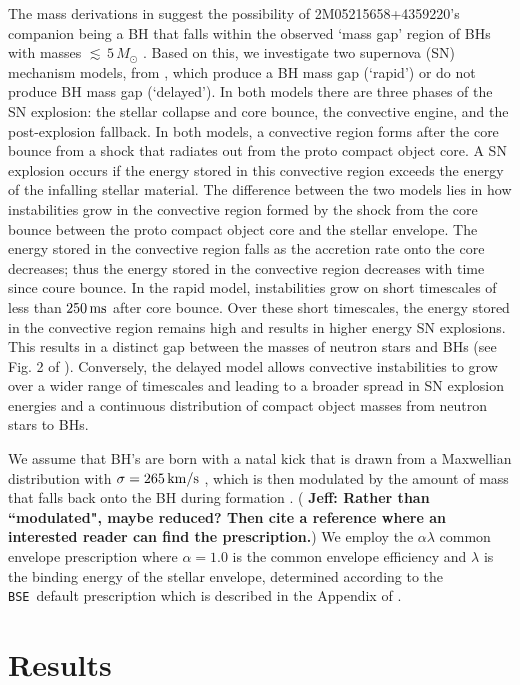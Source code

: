 \documentclass[twocolumn,tighten]{aastex61}
\newcommand{\ms}{\rm{ms}}
\newcommand{\bse}{\texttt{BSE}}
\newcommand{\jeff}[1]{\textbf{\color{teal} Jeff: #1}}
\begin{document}
The mass derivations in \citet{Thompson2018} suggest the possibility of 2M05215658+4359220's companion being a BH that falls within the observed `mass gap' region of BHs with masses $\lesssim\,5\,M_{\odot}$ \citep{Ozel2010, Farr2011}. Based on this, we investigate two supernova (SN) mechanism models, from \cite{Fryer2012}, which produce a BH mass gap (`rapid') or do not produce BH mass gap (`delayed'). In both models there are three phases of the SN explosion: the stellar collapse and core bounce, the convective engine, and the post-explosion fallback. In both models, a convective region forms after the core bounce from a shock that radiates out from the proto compact object core. A SN explosion occurs if the energy stored in this convective region exceeds the energy of the infalling stellar material. The difference between the two models lies in how instabilities grow in the convective region formed by the shock from the core bounce between the proto compact object core and the stellar envelope. The energy stored in the convective region falls as the accretion rate onto the core decreases; thus the energy stored in the convective region decreases with time since coure bounce.
In the rapid model, instabilities grow on short timescales of less than $250\,\ms$ after core bounce. Over these short timescales, the energy stored in the convective region remains high and results in higher energy SN explosions. This results in a distinct gap between the masses of neutron stars and BHs (see Fig. 2 of \citet{Fryer2012}). Conversely, the delayed model allows convective instabilities to grow over a wider range of timescales and leading to a broader spread in SN explosion energies and a continuous distribution of compact object masses from neutron stars to BHs.   

We assume that BH's are born with a natal kick that is drawn from a Maxwellian distribution with $\sigma=265\,\rm{km/s}$ \citep{Hobbs2005}, which is then modulated by the amount of mass that falls back onto the BH during formation \citep{Fryer2012}. (\jeff{Rather than ``modulated", maybe reduced? Then cite a reference where an interested reader can find the prescription.}) We employ the $\alpha\lambda$ common envelope prescription where $\alpha=1.0$ is the common envelope efficiency and $\lambda$ is the binding energy of the stellar envelope, determined according to the \bse\ default prescription which is described in the Appendix of \citet{Claeys2014}. 

%
\section{Results}
\label{S:results}
\end{document}
